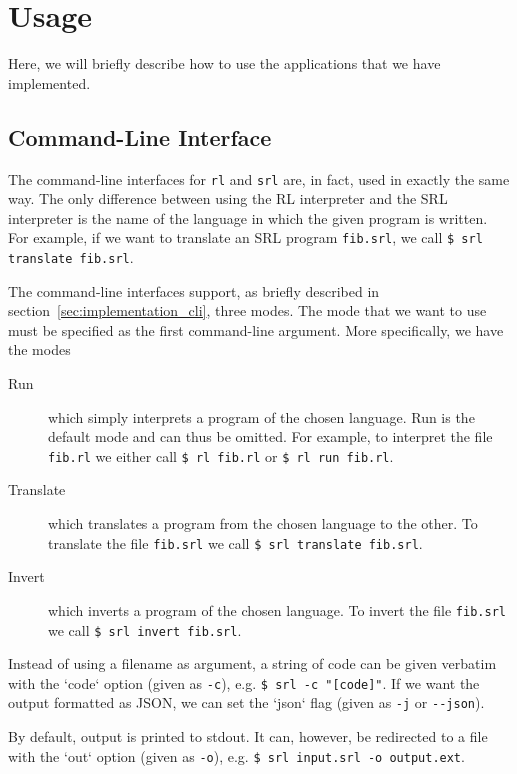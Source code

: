 \section{Usage}

Here, we will briefly describe how to use the applications that we have implemented.

\subsection{Command-Line Interface}

The command-line interfaces for \texttt{rl} and \texttt{srl} are, in fact, used in exactly the same way. The only difference between using the RL interpreter and the SRL interpreter is the name of the language in which the given program is written. For example, if we want to translate an SRL program \texttt{fib.srl}, we call \texttt{\$ srl translate fib.srl}.%

The command-line interfaces support, as briefly described in section~\ref{sec:implementation_cli}, three modes. The mode that we want to use must be specified as the first command-line argument. More specifically, we have the modes
\begin{description}

  \item[Run] which simply interprets a program of the chosen language. Run is the default mode and can thus be omitted. For example, to interpret the file \texttt{fib.rl} we either call \texttt{\$ rl fib.rl} or \texttt{\$ rl run fib.rl}.

  \item[Translate] which translates a program from the chosen language to the other. To translate the file \texttt{fib.srl} we call \texttt{\$ srl translate fib.srl}.

  \item[Invert] which inverts a program of the chosen language. To invert the file \texttt{fib.srl} we call \texttt{\$ srl invert fib.srl}.

\end{description}
Instead of using a filename as argument, a string of code can be given verbatim with the `code` option (given as \texttt{-c}), e.g. \texttt{\$ srl -c "[code]"}.  If we want the output formatted as JSON, we can set the `json` flag (given as \texttt{-j} or \texttt{{-}{-}json}).

By default, output is printed to stdout. It can, however, be redirected to a file with the `out` option (given as \texttt{-o}), e.g. \texttt{\$ srl input.srl -o output.ext}.


